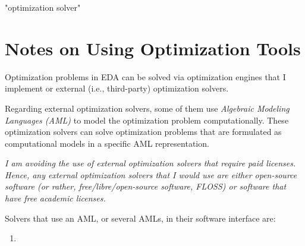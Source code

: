 "optimization solver"


\section{Notes on Using Optimization Tools}
\label{sec:NotesonUsingOptimizationTools}


Optimization problems in EDA can be solved via optimization engines that I implement or external (i.e., third-party) optimization solvers.

Regarding external optimization solvers, some of them use {\it Algebraic Modeling Languages (AML)} \cite{WikipediaContributors2015i} to model the optimization problem computationally. These optimization solvers can solve optimization problems that are formulated as computational models in a specific AML representation.

{\it I am avoiding the use of external optimization solvers that require paid licenses. Hence, any external optimization solvers that I would use are either open-source software (or rather, free/libre/open-source software, FLOSS) or software that have free academic licenses.}

Solvers that use an AML, or several AMLs, in their software interface are: \vspace{-0.3cm}
\begin{enumerate} \itemsep -4pt
\item 
\end{enumerate}




